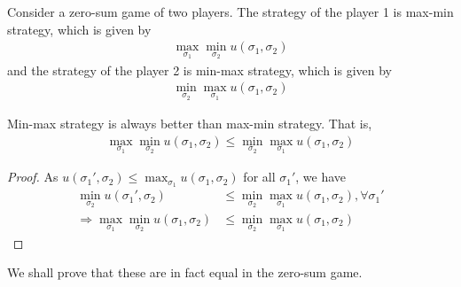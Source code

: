 \documentclass[11pt]{elegantbook_2}
\begin{document}
Consider a zero-sum game of two players. The strategy of the player 1 is max-min strategy, which is given by
\begin{equation}
    \begin{aligned}
        \max_{\sigma_1}\min_{\sigma_2}u(\sigma_1,\sigma_2)
    \end{aligned}
    \nonumber
\end{equation}
and the strategy of the player 2 is min-max strategy, which is given by
\begin{equation}
    \begin{aligned}
        \min_{\sigma_2}\max_{\sigma_1}u(\sigma_1,\sigma_2)
    \end{aligned}
    \nonumber
\end{equation}
\begin{proposition}
    Min-max strategy is always better than max-min strategy. That is,
    \begin{equation}
        \begin{aligned}
            \max_{\sigma_1}\min_{\sigma_2}u(\sigma_1,\sigma_2)\leq \min_{\sigma_2}\max_{\sigma_1}u(\sigma_1,\sigma_2)
        \end{aligned}
        \nonumber
    \end{equation}
\end{proposition}
\begin{proof}
    As $u(\sigma_1',\sigma_2)\leq \max_{\sigma_1}u(\sigma_1,\sigma_2)$ for all $\sigma_1'$, we have
    \begin{equation}
        \begin{aligned}
            \min_{\sigma_2}u(\sigma_1',\sigma_2)&\leq \min_{\sigma_2}\max_{\sigma_1}u(\sigma_1,\sigma_2),\forall \sigma_1'\\
            \Rightarrow \max_{\sigma_1}\min_{\sigma_2}u(\sigma_1,\sigma_2)&\leq \min_{\sigma_2}\max_{\sigma_1}u(\sigma_1,\sigma_2)
        \end{aligned}
        \nonumber
    \end{equation}
\end{proof}
We shall prove that these are in fact equal in the zero-sum game.
\end{document}
